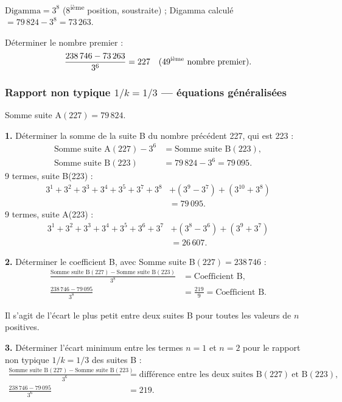 \documentclass[11pt,a4paper]{article}
\begin{document}
\begin{boitenote}
\begin{boitenote}[Inspiration]
$\text{Digamma} = 3^{8}$ (8\textsuperscript{ième} position, soustraite) ;\quad
Digamma calculé $= 79\,824 - 3^{8} = 73\,263$.

Déterminer le nombre premier :
\[
\frac{238\,746 - 73\,263}{3^{6}} = 227 \quad (49\textsuperscript{ième}\ \text{nombre premier}).
\]

\subsubsection{Rapport non typique $1/k = 1/3$ --- équations généralisées}

Somme suite A$(227) = 79\,824$.

\textbf{1.} Déterminer la somme de la suite B du nombre précédent 227, qui est 223 :
\begin{align*}
\text{Somme suite A}(227)-3^{6}
  &= \text{Somme suite B}(223),\\
\text{Somme suite B}(223)
  &= 79\,824-3^{6}=79\,095.
\end{align*}
9 termes, suite B(223) :
\begin{align*}
3^{1}+3^{2}+3^{3}+3^{4}+3^{5}+3^{7}+3^{8}
&+(3^{9}-3^{7})+(3^{10}+3^{8})\\
&=79\,095.
\end{align*}
9 termes, suite A(223) :
\begin{align*}
3^{1}+3^{2}+3^{3}+3^{4}+3^{5}+3^{6}+3^{7}
&+(3^{8}-3^{6})+(3^{9}+3^{7})\\
&=26\,607.
\end{align*}

\textbf{2.} Déterminer le coefficient B, avec Somme suite B$(227) = 238\,746$ :
\begin{align*}
\frac{\text{Somme suite B}(227) - \text{Somme suite B}(223)}{3^{8}}
&= \text{Coefficient B},\\
\frac{238\,746 - 79\,095}{3^{8}} &= \frac{219}{9} = \text{Coefficient B}.
\end{align*}
\vspace{0.3cm}
\begin{boitenote}
Il s'agit de l'écart le plus petit entre deux suites B pour toutes les valeurs
de $n$ positives.


\textbf{3.} Déterminer l'écart minimum entre les termes $n=1$ et $n=2$ pour le
rapport non typique $1/k = 1/3$ des suites B :
\begin{align*}
\frac{\text{Somme suite B}(227) - \text{Somme suite B}(223)}{3^{6}}
&= \text{différence entre les deux suites B}(227)\ \text{et B}(223),\\
\frac{238\,746 - 79\,095}{3^{6}} &= 219.
\end{align*}


\end{boitenote}
\end{boitenote}
\end{boitenote}
\end{document}
